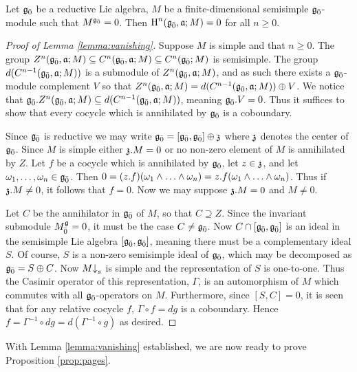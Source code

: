 \begin{lemma} \label{lemma:vanishing}
  Let ${\mathfrak{g}}_{\bar{0}}$ be a reductive Lie algebra, $M$ be a finite-dimensional semisimple ${\mathfrak{g}}_{\bar{0}}$-module such that $M^{{\mathfrak{g}}_{\bar{0}}} = 0$. Then $\operatorname{H}^n({\mathfrak{g}}_{\bar{0}},\mathfrak{a};M) = 0$ for all $n \geq 0$.
\end{lemma}
\begin{proof}[Proof of Lemma \ref{lemma:vanishing}]
  Suppose $M$ is simple and that $n \geq 0$. The group $Z^n({\mathfrak{g}}_{\bar{0}},\mathfrak{a};M) \subseteq C^n({\mathfrak{g}}_{\bar{0}},\mathfrak{a};M) \subseteq C^n({\mathfrak{g}}_{\bar{0}};M)$ is semisimple. The group $d(C^{n-1}({\mathfrak{g}}_{\bar{0}},\mathfrak{a};M))$ is a submodule of $Z^n({\mathfrak{g}}_{\bar{0}},\mathfrak{a};M)$, and as such there exists a ${\mathfrak{g}}_{\bar{0}}$-module complement $V$ so that $Z^n({\mathfrak{g}}_{\bar{0}},\mathfrak{a};M) = d(C^{n-1}({\mathfrak{g}}_{\bar{0}},\mathfrak{a};M)) \oplus V$. We notice that ${\mathfrak{g}}_{\bar{0}} . Z^n({\mathfrak{g}}_{\bar{0}},\mathfrak{a};M) \subseteq d(C^{n-1}({\mathfrak{g}}_{\bar{0}},\mathfrak{a};M))$, meaning ${\mathfrak{g}}_{\bar{0}} . V = 0$. Thus it suffices to show that every cocycle which is annihilated by ${\mathfrak{g}}_{\bar{0}}$ is a coboundary.

  Since ${\mathfrak{g}}_{\bar{0}}$ is reductive we may write ${\mathfrak{g}}_{\bar{0}} = [{\mathfrak{g}}_{\bar{0}},{\mathfrak{g}}_{\bar{0}}] \oplus \mathfrak{z}$ where $\mathfrak{z}$ denotes the center of ${\mathfrak{g}}_{\bar{0}}$. Since $M$ is simple either $\mathfrak{z} . M = 0$ or no non-zero element of $M$ is annihilated by $Z$. Let $f$ be a cocycle which is annihilated by ${\mathfrak{g}}_{\bar{0}}$, let $z \in \mathfrak{z}$, and let $\omega_1,\ldots,\omega_n \in {\mathfrak{g}}_{\bar{0}}$. Then $0 = (z.f)(\omega_1 \wedge \ldots \wedge \omega_n) = z. f(\omega_1 \wedge \ldots \wedge \omega_n)$. Thus if $\mathfrak{z}.M \neq 0$, it follows that $f = 0$. Now we may suppose $\mathfrak{z}.M = 0$ and $M \neq 0$.

  Let $C$ be the annihilator in ${\mathfrak{g}}_{\bar{0}}$ of $M$, so that $C \supseteq Z$. Since the invariant submodule $M^{\mathfrak{g}}_{\bar{0}} = 0$, it must be the case $C \neq {\mathfrak{g}}_{\bar{0}}$. Now $C \cap [{\mathfrak{g}}_{\bar{0}},{\mathfrak{g}}_{\bar{0}}]$ is an ideal in the semisimple Lie algebra $[{\mathfrak{g}}_{\bar{0}},{\mathfrak{g}}_{\bar{0}}]$, meaning there must be a complementary ideal $S$. Of course, $S$ is a non-zero semisimple ideal of ${\mathfrak{g}}_{\bar{0}}$, which may be decomposed as ${\mathfrak{g}}_{\bar{0}} = S \oplus C$. Now $M\mathord{\downarrow}_s$ is simple and the representation of $S$ is one-to-one. Thus the Casimir operator of this representation, $\Gamma$, is an automorphism of $M$ which commutes with all ${\mathfrak{g}}_{\bar{0}}$-operators on $M$. Furthermore, since $[S,C] = 0$, it is seen that for any relative cocycle $f$, $\Gamma \circ f = dg$ is a coboundary. Hence $f = \Gamma^{-1} \circ dg = d( \Gamma^{-1} \circ g)$ as desired.
\end{proof}

With Lemma \ref{lemma:vanishing} established, we are now ready to prove Proposition \ref{prop:pages}.

